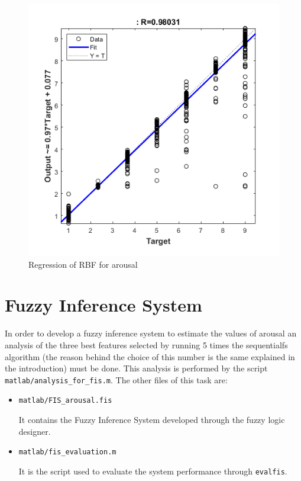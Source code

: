 \documentclass[a4paper]{report}
\begin{document}
	\begin{figure}[htbp]
		\centering
		\includegraphics[scale=1]{img/regression_rbf_arousal.png}
		\caption{Regression of RBF for arousal}
		\label{img: regression_rbf_arousal}
	\end{figure}
	
\chapter{Fuzzy Inference System}
	\noindent In order to develop a fuzzy inference system to estimate the values of arousal an analysis of the three best features selected by running 5 times the sequentialfs algorithm (the reason behind the choice of this number is the same explained in the introduction) must be done. This analysis is performed by the script \texttt{matlab/analysis\_for\_fis.m}. The other files of this task are:
	\begin{itemize}
		\item \texttt{matlab/FIS\_arousal.fis}
		
		\noindent It contains the Fuzzy Inference System developed through the fuzzy logic designer.
		
		\item \texttt{matlab/fis\_evaluation.m}
		
		\noindent It is the script used to evaluate the system performance through \texttt{evalfis}.		
\end{itemize}
	
\end{document}
